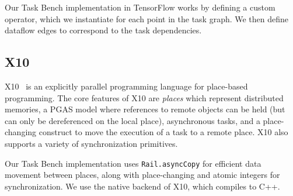Our Task Bench implementation in TensorFlow works by defining a custom
operator, which we instantiate for each point in the task graph. We
then define dataflow edges to correspond to the task dependencies.

\subsection{X10}

X10~\cite{X1005} is an explicitly parallel programming language for
place-based programming. The core features of X10 are \emph{places}
which represent distributed memories, a PGAS model where references to
remote objects can be held (but can only be dereferenced on the local
place), asynchronous tasks, and a place-changing construct to move the
execution of a task to a remote place. X10 also supports a variety of
synchronization primitives.

Our Task Bench implementation uses
\lstinline[language=X10]{Rail.asyncCopy} for efficient data movement
between places, along with place-changing and atomic integers for
synchronization. We use the native backend of X10, which compiles to
C++.
